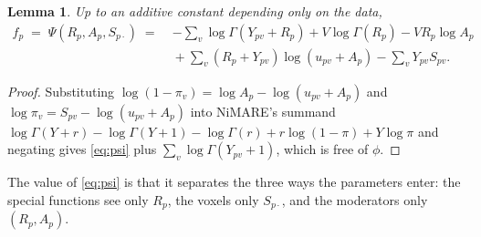 \documentclass[11pt,a4paper]{article}
\theoremstyle{plain}
\newtheorem{lemma}[proposition]{Lemma}
\theoremstyle{definition}
\begin{document}
\begin{lemma}\label{lem:nb-psi}
Up to an additive constant depending only on the data,
\begin{equation}\label{eq:psi}
\begin{split}
  f_p \;=\; \Psi(R_p, A_p, S_{p\cdot}) \;=\;{}& -\sum_v \log\Gamma(Y_{pv}+R_p)
     + V\log\Gamma(R_p) - VR_p\log A_p\\
     &{}+ \sum_v (R_p+Y_{pv})\log(u_{pv}+A_p) - \sum_v Y_{pv}S_{pv}.
\end{split}
\end{equation}
\end{lemma}

\begin{proof}
Substituting $\log(1-\pi_v) = \log A_p - \log(u_{pv}+A_p)$ and
$\log \pi_v = S_{pv} - \log(u_{pv}+A_p)$ into NiMARE's summand
$\log\Gamma(Y+r) - \log\Gamma(Y+1) - \log\Gamma(r) + r\log(1-\pi) + Y\log\pi$ and negating gives
\eqref{eq:psi} plus $\sum_v \log\Gamma(Y_{pv}+1)$, which is free of $\phi$.
\end{proof}

The value of \eqref{eq:psi} is that it separates the three ways the parameters enter: the special
functions see only $R_p$, the voxels only $S_{p\cdot}$, and the moderators only $(R_p, A_p)$.
\end{document}
